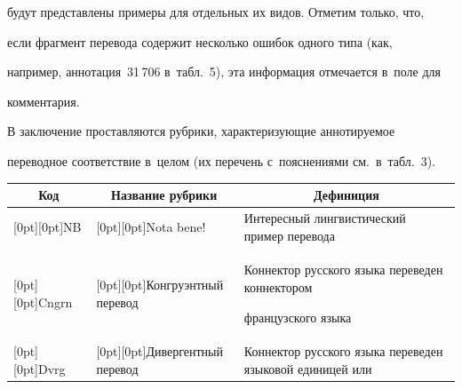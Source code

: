 будут представлены примеры для отдельных их видов. Отметим только, что, 


если фрагмент перевода содержит несколько ошибок одного типа (как, 


например, аннотация~31\,706 в~табл.~5), эта информация отмечается в~поле для 


комментария.


  


  В заключение проставляются рубрики, характеризующие аннотируемое 


переводное соответствие в~целом (их перечень с~пояснениями см.\ в~табл.~3).


  


  \begin{table}\small %


  \begin{center}




  \vspace*{2ex}


  


  \begin{tabular}{|l|l|p{56mm}|}


  \hline


 \multicolumn{1}{|c|}{Код}&\multicolumn{1}{c|}{Название рубрики}&\multicolumn{1}{c|}{Дефиниция}\\


\hline


\multicolumn{1}{|l|}{\raisebox{-6pt}[0pt][0pt]{NB}}&


\multicolumn{1}{l|}{\raisebox{-6pt}[0pt][0pt]{Nota bene!}}&Интересный лингвистический пример перевода\\


\hline


\multicolumn{1}{|l|}{\raisebox{-6pt}[0pt][0pt]{Cngrn}}&


\multicolumn{1}{|l|}{\raisebox{-6pt}[0pt][0pt]{Конгруэнтный перевод}}&Коннектор русского языка переведен коннектором 


французского языка\\


\hline


\multicolumn{1}{|l|}{\raisebox{-10pt}[0pt][0pt]{Dvrg}}&


\multicolumn{1}{|l|}{\raisebox{-10pt}[0pt][0pt]{Дивергентный перевод}}&Коннектор русского языка переведен языковой единицей или 



\end{tabular}
\end{center}
\end{table}
